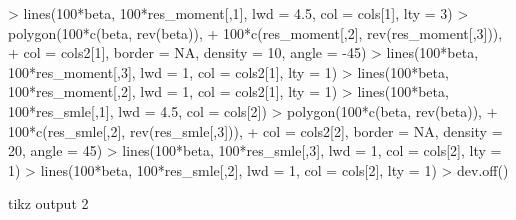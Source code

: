 \documentclass{article}
\begin{document}
\begin{Schunk}
\begin{Sinput}
> lines(100*beta, 100*res_moment[,1], lwd = 4.5, col = cols[1], lty = 3)
> polygon(100*c(beta, rev(beta)),
+         100*c(res_moment[,2], rev(res_moment[,3])),
+         col = cols2[1], border = NA, density = 10, angle = -45)
> lines(100*beta, 100*res_moment[,3], lwd = 1, col = cols2[1], lty = 1)
> lines(100*beta, 100*res_moment[,2], lwd = 1, col = cols2[1], lty = 1)
> lines(100*beta, 100*res_smle[,1], lwd = 4.5, col = cols[2])
> polygon(100*c(beta, rev(beta)),
+         100*c(res_smle[,2], rev(res_smle[,3])),
+         col = cols2[2], border = NA, density = 20, angle = 45)
> lines(100*beta, 100*res_smle[,3], lwd = 1, col = cols[2], lty = 1)
> lines(100*beta, 100*res_smle[,2], lwd = 1, col = cols[2], lty = 1)
> dev.off()
\end{Sinput}
\begin{Soutput}
tikz output 
          2 
\end{Soutput}
\end{Schunk}

\begin{figure}

\end{figure}

\begin{figure}

\end{figure}

\begin{figure}

\end{figure}
\end{document}
